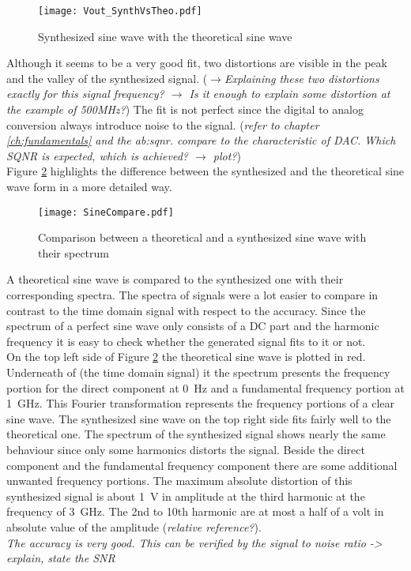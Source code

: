 \begin{figure}[htb!]
   \centering
   \texttt{[image: Vout\_SynthVsTheo.pdf]}
   \caption{Synthesized sine wave with the theoretical sine wave}
   \label{fig:SineWaveSynthVsTheoretical}
\end{figure}

Although it seems to be a very good fit, two distortions are visible in the peak and the valley of the synthesized signal.
($\rightarrow$\textit{Explaining these two distortions exactly for this signal frequency? $\rightarrow$ Is it enough to explain some distortion at the example of 500MHz?})
The fit is not perfect since the digital to analog conversion always introduce noise to the signal. 
(\textit{refer to chapter \ref{ch:fundamentals} and the \gls{ab:sqnr}. compare to the characteristic of DAC. Which SQNR is expected, which is achieved? $\rightarrow$ plot?}) \\

Figure \ref{fig:SineCompare} highlights the difference between the synthesized and the theoretical sine wave form in a more detailed way.

\begin{figure}[htb!]
	\centering
  \texttt{[image: SineCompare.pdf]}
	\caption{Comparison between a theoretical and a synthesized sine wave with their spectrum}
	\label{fig:SineCompare}
\end{figure}

A theoretical sine wave is compared to the synthesized one with their corresponding spectra.
The spectra of signals were a lot easier to compare in contrast to the time domain signal with respect to the accuracy.
Since the spectrum of a perfect sine wave only consists of a DC part and the harmonic frequency it is easy to check whether the generated signal fits to it or not.\\
On the top left side of Figure \ref{fig:SineCompare} the theoretical sine wave is plotted in red. Underneath of (the time domain signal) it the spectrum presents the frequency portion for the direct component at \SI{0} {\Hz} and a fundamental frequency portion at \SI{1}{\GHz}.
This Fourier transformation represents the frequency portions of a clear sine wave. 
The synthesized sine wave on the top right side fits fairly well to the theoretical one.
The spectrum of the synthesized signal shows nearly the same behaviour since only some harmonics distorts the signal.
Beside the direct component and the fundamental frequency component there are some additional unwanted frequency portions.
The maximum absolute distortion of this synthesized signal is about \SI{1}{\volt} in amplitude at the third harmonic at the frequency of \SI{3}{\GHz}.
 The 2nd to 10th harmonic are at most a half of a volt in absolute value of the amplitude (\textit{relative reference?}). \\
\textit{The accuracy is very good. This can be verified by the signal to noise ratio -> explain, state the SNR}


